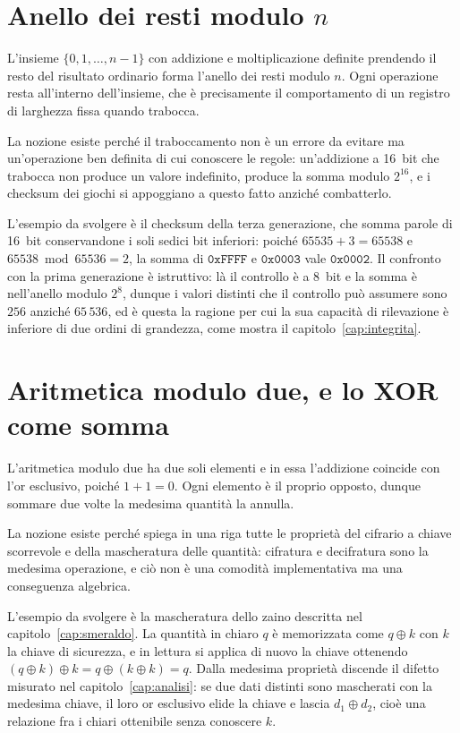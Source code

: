 \section{Anello dei resti modulo $n$}

L'insieme $\{0, 1, \dots, n-1\}$ con addizione e moltiplicazione definite prendendo il resto del risultato ordinario forma l'anello dei resti modulo $n$. Ogni operazione resta all'interno dell'insieme, che è precisamente il comportamento di un registro di larghezza fissa quando trabocca.

La nozione esiste perché il traboccamento non è un errore da evitare ma un'operazione ben definita di cui conoscere le regole: un'addizione a \SI{16}{bit} che trabocca non produce un valore indefinito, produce la somma modulo $2^{16}$, e i checksum dei giochi si appoggiano a questo fatto anziché combatterlo.

L'esempio da svolgere è il checksum della terza generazione, che somma parole di \SI{16}{bit} conservandone i soli sedici bit inferiori: poiché $65535 + 3 = 65538$ e $65538 \bmod 65536 = 2$, la somma di $\mathtt{0xFFFF}$ e $\mathtt{0x0003}$ vale $\mathtt{0x0002}$. Il confronto con la prima generazione è istruttivo: là il controllo è a \SI{8}{bit} e la somma è nell'anello modulo $2^8$, dunque i valori distinti che il controllo può assumere sono $256$ anziché $65\,536$, ed è questa la ragione per cui la sua capacità di rilevazione è inferiore di due ordini di grandezza, come mostra il capitolo~\ref{cap:integrita}.

\section{Aritmetica modulo due, e lo XOR come somma}

L'aritmetica modulo due ha due soli elementi e in essa l'addizione coincide con l'or esclusivo, poiché $1 + 1 = 0$. Ogni elemento è il proprio opposto, dunque sommare due volte la medesima quantità la annulla.

La nozione esiste perché spiega in una riga tutte le proprietà del cifrario a chiave scorrevole e della mascheratura delle quantità: cifratura e decifratura sono la medesima operazione, e ciò non è una comodità implementativa ma una conseguenza algebrica.

L'esempio da svolgere è la mascheratura dello zaino descritta nel capitolo~\ref{cap:smeraldo}. La quantità in chiaro $q$ è memorizzata come $q \oplus k$ con $k$ la chiave di sicurezza, e in lettura si applica di nuovo la chiave ottenendo $(q \oplus k) \oplus k = q \oplus (k \oplus k) = q$. Dalla medesima proprietà discende il difetto misurato nel capitolo~\ref{cap:analisi}: se due dati distinti sono mascherati con la medesima chiave, il loro or esclusivo elide la chiave e lascia $d_1 \oplus d_2$, cioè una relazione fra i chiari ottenibile senza conoscere $k$.

